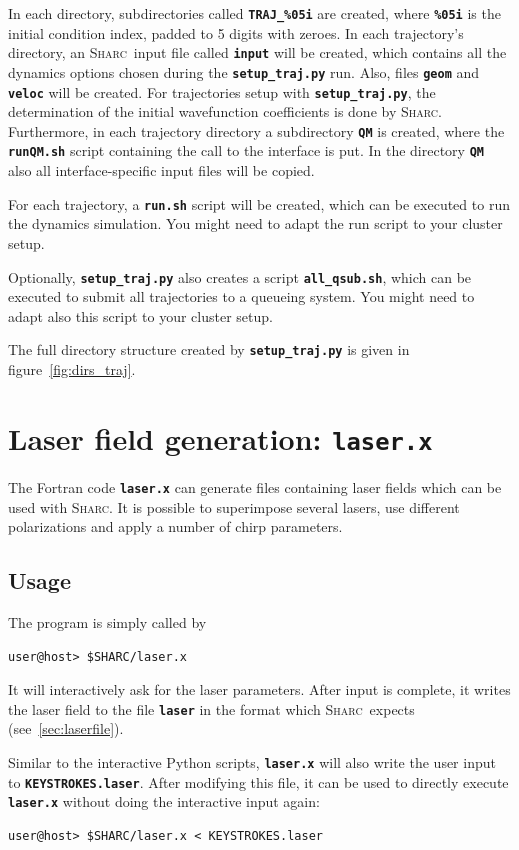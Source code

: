 \documentclass[a4paper,11pt,DIV=15,openany,twoside=false]{scrbook}
\newcommand{\sharc}{\textsc{Sharc}}
\newcommand{\ttt}[1]{\textbf{\texttt{#1}}}
\begin{document}
In each directory, subdirectories called \ttt{TRAJ\_\%05i} are created, where \ttt{\%05i} is the initial condition index, padded to 5 digits with zeroes. In each trajectory's directory, an \sharc\ input file called \ttt{input} will be created, which contains all the dynamics options chosen during the \ttt{setup\_traj.py} run. Also, files \ttt{geom} and \ttt{veloc} will be created. For trajectories setup with \ttt{setup\_traj.py}, the determination of the initial wavefunction coefficients is done by \sharc.
Furthermore, in each trajectory directory a subdirectory \ttt{QM} is created, where the \ttt{runQM.sh} script containing the call to the interface is put. In the directory \ttt{QM} also all interface-specific input files will be copied.

For each trajectory, a \ttt{run.sh} script will be created, which can be executed to run the dynamics simulation. You might need to adapt the run script to your cluster setup.

Optionally, \ttt{setup\_traj.py} also creates a script \ttt{all\_qsub.sh}, which can be executed to submit all trajectories to a queueing system. You might need to adapt also this script to your cluster setup.

The full directory structure created by \ttt{setup\_traj.py} is given in figure~\ref{fig:dirs_traj}.



\section{Laser field generation: \ttt{laser.x}}\label{sec:laser.x}

The Fortran code \ttt{laser.x} can generate files containing laser fields which can be used with \sharc. It is possible to superimpose several lasers, use different polarizations and apply a number of chirp parameters.

\subsection{Usage}

The program is simply called by 
\begin{verbatim}
user@host> $SHARC/laser.x
\end{verbatim}
It will interactively ask for the laser parameters. After input is complete, it writes the laser field to the file \ttt{laser} in the format which \sharc\ expects (see~\ref{sec:laserfile}).

Similar to the interactive Python scripts, \ttt{laser.x} will also write the user input to \ttt{KEYSTROKES.laser}. After modifying this file, it can be used to directly execute \ttt{laser.x} without doing the interactive input again:
\begin{verbatim}
user@host> $SHARC/laser.x < KEYSTROKES.laser
\end{verbatim}
\end{document}
